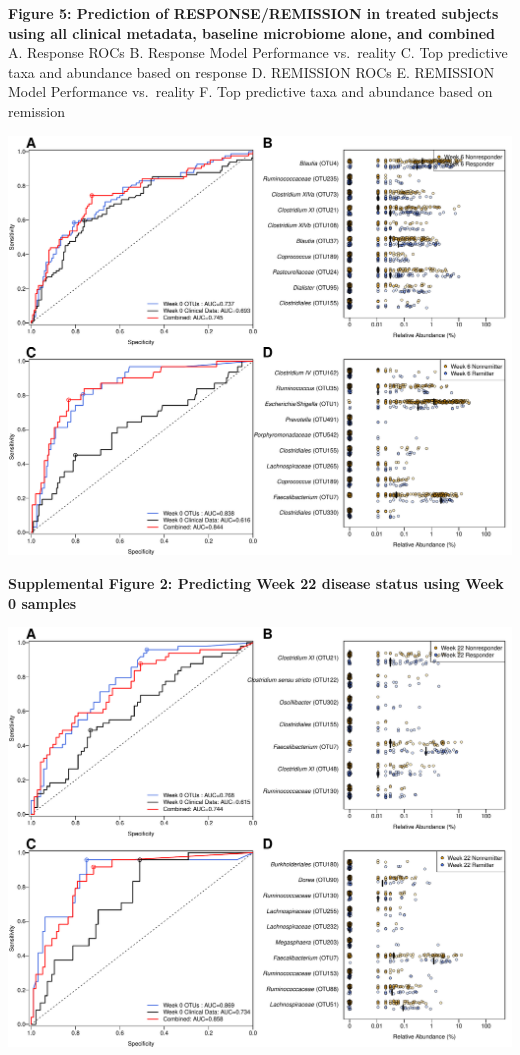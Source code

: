 \documentclass[11pt,]{article}
\begin{document}
\newpage

\textbf{Figure 5: Prediction of RESPONSE/REMISSION in treated subjects
using all clinical metadata, baseline microbiome alone, and combined} A.
Response ROCs B. Response Model Performance vs.~reality C. Top
predictive taxa and abundance based on response D. REMISSION ROCs E.
REMISSION Model Performance vs.~reality F. Top predictive taxa and
abundance based on remission

\includegraphics{figures/Figure4.pdf}

\newpage

\textbf{Supplemental Figure 2: Predicting Week 22 disease status using
Week 0 samples}

\includegraphics{figures/SF3.pdf}
\end{document}
